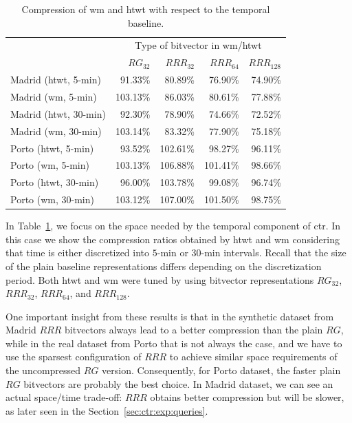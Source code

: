 	\begin{table}[ht]
	\begin{center}
	\caption{Compression of \acrshort{wm} and \acrshort{htwt} with respect to the temporal baseline.}
	\label{table:ctr:exp:space:wt}
	  \begin{tabular}{|l|*{4}{r}|}
	  \cline{2-5}
	  \multicolumn{1}{c|}{} & \multicolumn{4}{c|}{Type of bitvector in \gls{wm}/\gls{htwt}}\\

	  \multicolumn{1}{c|}{}   & $RG_{32}$& $RRR_{32}$& $RRR_{64}$& $RRR_{128}$\\
	  \hline                                             
	  Madrid (\gls{htwt}, 5-min) &  91.33\% &	 80.89\% &	 76.90\% & 	 74.90\% \\
	  Madrid (\gls{wm}, 5-min)   & 103.13\% &	 86.03\% &	 80.61\% & 	 77.88\% \\
	  Madrid (\gls{htwt}, 30-min)&  92.30\% &	 78.90\% &	 74.66\% &	 72.52\% \\
	  Madrid (\gls{wm}, 30-min)  & 103.14\% &	 83.32\% &	 77.90\% &	 75.18\% \\
	  \hline                  
	  Porto (\gls{htwt}, 5-min)  &  93.52\% &	102.61\% &	 98.27\% &	 96.11\% \\
	  Porto (\gls{wm}, 5-min)    & 103.13\% &	106.88\% &	101.41\% &	 98.66\% \\
	  Porto (\gls{htwt}, 30-min) &  96.00\% &	103.78\% &	 99.08\% &	 96.74\% \\
	  Porto (\gls{wm}, 30-min)   & 103.12\% &	107.00\% &	101.50\% &	 98.75\% \\

	  \hline
	  \cline{2-5}
	  \end{tabular}
	\end{center}
	\end{table}

	In Table~\ref{table:ctr:exp:space:wt}, we focus on the space needed by the temporal component of \gls{ctr}. 
	In this case we show the compression ratios obtained by \gls{htwt} and \gls{wm} 
	considering that time is either discretized into $5$-min or $30$-min intervals. Recall that the size of the 
	plain baseline representations differs depending on the discretization period. Both \gls{htwt} and \gls{wm} were tuned by
	using bitvector representations $RG_{32}$, $RRR_{32}$, $RRR_{64}$, and $ RRR_{128}$.

	One important insight from these results is that in the synthetic dataset from Madrid $RRR$ bitvectors always lead to a better compression than the plain $RG$, while in the real dataset from Porto that is not always the case, and we have to use the sparsest configuration of $RRR$ to achieve similar space requirements of the uncompressed $RG$ version. Consequently, for Porto dataset, the faster plain $RG$ bitvectors are probably the best choice. In Madrid dataset, we can see an actual space/time trade-off: $RRR$ obtains better compression but will be slower, as later seen in the Section~\ref{sec:ctr:exp:queries}.

